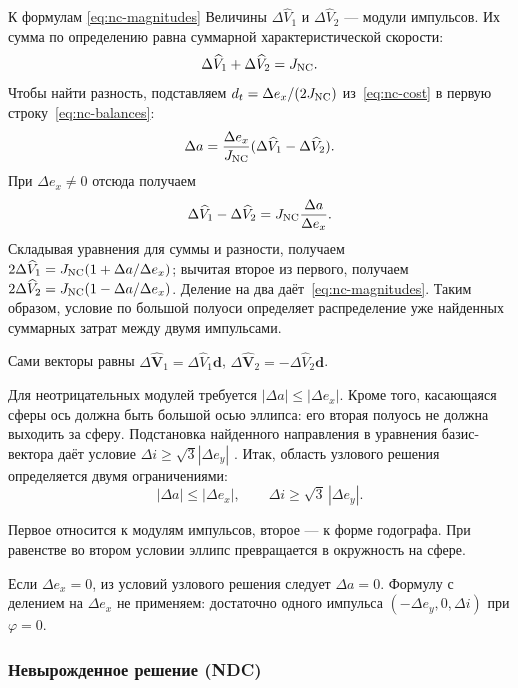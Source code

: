 \begin{explanation}{К формулам \eqref{eq:nc-magnitudes}}
Величины $\Delta\widehat V_1$ и $\Delta\widehat V_2$ --- модули
импульсов. Их сумма по определению равна суммарной характеристической
скорости:
\[
 \Delta\widehat V_1+\Delta\widehat V_2=J_{\rm NC}.
\]
Чтобы найти разность, подставляем
$d_t=\Delta e_x/(2J_{\rm NC})$ из~\eqref{eq:nc-cost}
в первую строку~\eqref{eq:nc-balances}:
\[
 \Delta a=\frac{\Delta e_x}{J_{\rm NC}}
          (\Delta\widehat V_1-\Delta\widehat V_2).
\]
При $\Delta e_x\ne0$ отсюда получаем
\[
 \Delta\widehat V_1-\Delta\widehat V_2
 =J_{\rm NC}\frac{\Delta a}{\Delta e_x}.
\]
Складывая уравнения для суммы и разности, получаем
$2\Delta\widehat V_1=J_{\rm NC}(1+\Delta a/\Delta e_x)$;
вычитая второе из первого, получаем
$2\Delta\widehat V_2=J_{\rm NC}(1-\Delta a/\Delta e_x)$.
Деление на два даёт~\eqref{eq:nc-magnitudes}.
Таким образом, условие по большой полуоси определяет распределение
уже найденных суммарных затрат между двумя импульсами.
\end{explanation}

Сами векторы равны
$\Delta\widehat{\boldsymbol V}_1=\Delta\widehat V_1\boldsymbol d$,
$\Delta\widehat{\boldsymbol V}_2=-\Delta\widehat V_2\boldsymbol d$.

Для неотрицательных модулей требуется
$|\Delta a|\leq|\Delta e_x|$.
Кроме того, касающаяся сферы ось должна быть большой осью эллипса:
его вторая полуось не должна выходить за сферу.
Подстановка найденного направления в уравнения базис-вектора
даёт условие $\Delta i\geq\sqrt3|\Delta e_y|$ \cite[гл.~2]{baranov-ru}.
Итак, область узлового решения определяется двумя ограничениями:
\begin{equation}
 \boxed{\quad |\Delta a|\leq|\Delta e_x|,\qquad
                   \Delta i\geq\sqrt3\,|\Delta e_y|.\quad}
 \label{eq:nc-region}
\end{equation}

Первое относится к модулям импульсов, второе --- к форме годографа.
При равенстве во втором условии эллипс превращается в окружность на сфере.

Если $\Delta e_x=0$, из условий узлового решения следует $\Delta a=0$.
Формулу с делением на $\Delta e_x$ не применяем: достаточно одного
импульса $(-\Delta e_y,0,\Delta i)$ при $\varphi=0$.


\subsubsection{Невырожденное решение (NDC)}
\label{sec:NDC}

